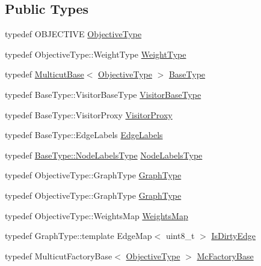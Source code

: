 \subsection*{Public Types}
\begin{DoxyCompactItemize}
\item 
typedef O\+B\+J\+E\+C\+T\+I\+VE \hyperlink{classnifty_1_1graph_1_1opt_1_1multicut_1_1BlockMulticut_a3a9ea9285ed606615a72dead69babd0a}{Objective\+Type}
\item 
typedef Objective\+Type\+::\+Weight\+Type \hyperlink{classnifty_1_1graph_1_1opt_1_1multicut_1_1BlockMulticut_ac321d376710cf907c0ede34c536c79a5}{Weight\+Type}
\item 
typedef \hyperlink{classnifty_1_1graph_1_1opt_1_1multicut_1_1MulticutBase}{Multicut\+Base}$<$ \hyperlink{classnifty_1_1graph_1_1opt_1_1multicut_1_1BlockMulticut_a3a9ea9285ed606615a72dead69babd0a}{Objective\+Type} $>$ \hyperlink{classnifty_1_1graph_1_1opt_1_1multicut_1_1BlockMulticut_a5faaa5d12aee25352f643f040c9f8295}{Base\+Type}
\item 
typedef Base\+Type\+::\+Visitor\+Base\+Type \hyperlink{classnifty_1_1graph_1_1opt_1_1multicut_1_1BlockMulticut_aa40e397b4bec33962317d71164d34c49}{Visitor\+Base\+Type}
\item 
typedef Base\+Type\+::\+Visitor\+Proxy \hyperlink{classnifty_1_1graph_1_1opt_1_1multicut_1_1BlockMulticut_afc4c4a7b58fd11f84feab8791e1a0e94}{Visitor\+Proxy}
\item 
typedef Base\+Type\+::\+Edge\+Labels \hyperlink{classnifty_1_1graph_1_1opt_1_1multicut_1_1BlockMulticut_a7ff3652347070b677128196d42f0edd2}{Edge\+Labels}
\item 
typedef \hyperlink{classnifty_1_1graph_1_1opt_1_1common_1_1SolverBase_abefd51561de2fd009f6bed6bef6009ea}{Base\+Type\+::\+Node\+Labels\+Type} \hyperlink{classnifty_1_1graph_1_1opt_1_1multicut_1_1BlockMulticut_a15d311d945f41644c0f7230f8fb62335}{Node\+Labels\+Type}
\item 
typedef Objective\+Type\+::\+Graph\+Type \hyperlink{classnifty_1_1graph_1_1opt_1_1multicut_1_1BlockMulticut_a0fb42cd4e7549370647f5b97a13f36cc}{Graph\+Type}
\item 
typedef Objective\+Type\+::\+Graph\+Type \hyperlink{classnifty_1_1graph_1_1opt_1_1multicut_1_1BlockMulticut_a0fb42cd4e7549370647f5b97a13f36cc}{Graph\+Type}
\item 
typedef Objective\+Type\+::\+Weights\+Map \hyperlink{classnifty_1_1graph_1_1opt_1_1multicut_1_1BlockMulticut_ac809724222ec8a96dfe99b414fb57168}{Weights\+Map}
\item 
typedef Graph\+Type\+::template Edge\+Map$<$ uint8\+\_\+t $>$ \hyperlink{classnifty_1_1graph_1_1opt_1_1multicut_1_1BlockMulticut_a28a7a6db633242bc0d826a5814fa4262}{Is\+Dirty\+Edge}
\item 
typedef Multicut\+Factory\+Base$<$ \hyperlink{classnifty_1_1graph_1_1opt_1_1multicut_1_1BlockMulticut_a3a9ea9285ed606615a72dead69babd0a}{Objective\+Type} $>$ \hyperlink{classnifty_1_1graph_1_1opt_1_1multicut_1_1BlockMulticut_add71703aaed725b89f664a0dba768685}{Mc\+Factory\+Base}
\end{DoxyCompactItemize}
